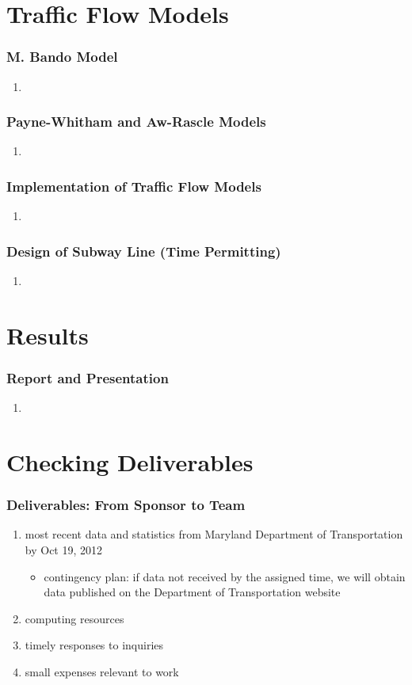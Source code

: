 \documentclass[compress,handout,10pt]{beamer}
\let\olditem\item
\renewcommand{\item}{\setlength{\itemsep}{0.5\baselineskip}\olditem}
\begin{document}
\section{Traffic Flow Models}
\begin{frame}
    \frametitle{M. Bando Model}
     \begin{enumerate}
	\item 
     \end{enumerate}
\end{frame}

\begin{frame}
    \frametitle{Payne-Whitham and Aw-Rascle Models}
     \begin{enumerate}
	\item 
     \end{enumerate}
\end{frame}

\begin{frame}
    \frametitle{Implementation of Traffic Flow Models}
     \begin{enumerate}
	\item 
     \end{enumerate}
\end{frame}

\begin{frame}
    \frametitle{Design of Subway Line (Time Permitting)}
     \begin{enumerate}
	\item 
     \end{enumerate}
\end{frame}

\section{Results}
\begin{frame}
    \frametitle{Report and Presentation}
     \begin{enumerate}
	\item 
     \end{enumerate}
\end{frame}

\section{Checking Deliverables}
\begin{frame}
    \frametitle{Deliverables: From Sponsor to Team}
    \begin{enumerate}
        \item most recent data and statistics from Maryland Department of Transportation by Oct 19, 2012
	\begin{itemize}
		\item contingency plan: if data not received by the assigned time, we will obtain data published on the Department of Transportation website
	\end{itemize}
	\item computing resources
	\item timely responses to inquiries
	\item small expenses relevant to work
    \end{enumerate}
\end{frame}
\end{document}
